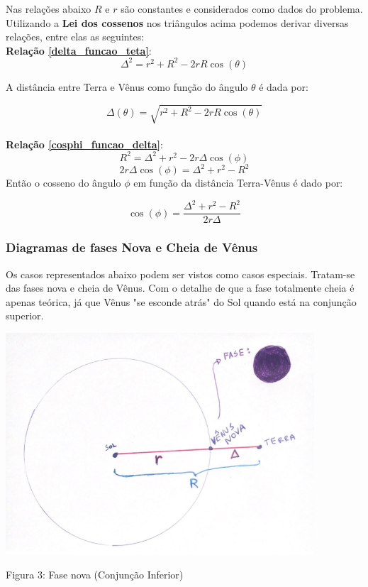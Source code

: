 \documentclass[a4paper, 12pt]{article}
\begin{document}
Nas relações abaixo $R$ e $r$ são constantes e considerados como dados do problema. Utilizando a \textbf{Lei dos cossenos} nos triângulos acima podemos derivar diversas relações, entre elas as seguintes:\\

\textbf{Relação \ref{delta_funcao_teta}}:
$$\Delta ^2=r^2+R^2-2rR\cos \left(\theta \right)$$

A distância entre Terra e Vênus como função do ângulo $\theta$ é dada por:

\begin{equation}\label{delta_funcao_teta}
    \boxed{\Delta \left(\theta \right)=\sqrt{r^2+R^2-2rR\cos \left(\theta \right)}}
\end{equation}\\


\textbf{Relação \ref{cosphi_funcao_delta}}:
$$R^2=\Delta ^2+r^2-2r\Delta \cos \left(\phi \right)$$
$$2r\Delta \cos \left(\phi \right)=\Delta ^2+r^2-R^2$$
Então o cosseno do ângulo $\phi$ em função da distância Terra-Vênus é dado por:

\begin{equation}\label{cosphi_funcao_delta}
    \boxed{\cos \left(\phi \right)=\frac{\Delta ^2+r^2-R^2}{2r\Delta }}
\end{equation}


\subsubsection{Diagramas de fases Nova e Cheia de Vênus}

Os casos representados abaixo podem ser vistos como casos especiais. Tratam-se das fases nova e cheia de Vênus. Com o detalhe de que a fase totalmente cheia é apenas teórica, já que Vênus "se esconde atrás" do Sol quando está na conjunção superior. 

\begin{center}
    \includegraphics[width=11.5cm]{03-nova.PNG}
    
    Figura 3: Fase nova (Conjunção Inferior)
\end{center}
\end{document}
